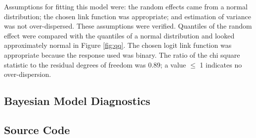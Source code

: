 \documentclass[12pt]{article}
\begin{document}
Assumptions for fitting this model were: the random effects came from a normal distribution; the chosen link function was appropriate; and estimation of variance was not over-dispersed. These assumptions were verified. Quantiles of the random effect were compared with the quantiles of a normal distribution and looked approximately normal in Figure \ref{fig:qq}. The chosen logit link function was appropriate because the response used was binary. The ratio of the chi square statistic to the residual degrees of freedom was 0.89; a value \(\le\) 1 indicates no over-dispersion.

\hypertarget{bayesian-model-diagnostics}{%
\subsection{Bayesian Model Diagnostics}\label{bayesian-model-diagnostics}}

\label{sec:bayesd}

\hypertarget{source-code}{%
\subsection{Source Code}\label{source-code}}
\end{document}
